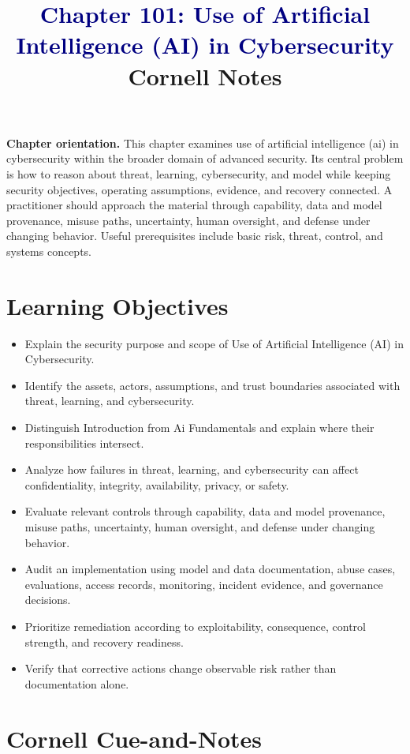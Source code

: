 \documentclass[11pt]{article}
\title{\textcolor{Navy}{Chapter 101: Use of Artificial Intelligence (AI) in Cybersecurity}\\[2mm]\large Cornell Notes}
\author{}
\date{}
\begin{document}
\maketitle
\thispagestyle{fancy}
\vspace{-1.5em}
\begin{orientationbox}
\textbf{Chapter orientation.} This chapter examines use of artificial intelligence (ai) in cybersecurity within the broader domain of advanced security. Its central problem is how to reason about threat, learning, cybersecurity, and model while keeping security objectives, operating assumptions, evidence, and recovery connected. A practitioner should approach the material through capability, data and model provenance, misuse paths, uncertainty, human oversight, and defense under changing behavior. Useful prerequisites include basic risk, threat, control, and systems concepts.
\end{orientationbox}
\section*{Learning Objectives}
\begin{itemize}
\item Explain the security purpose and scope of Use of Artificial Intelligence (AI) in Cybersecurity.
\item Identify the assets, actors, assumptions, and trust boundaries associated with threat, learning, and cybersecurity.
\item Distinguish Introduction from Ai Fundamentals and explain where their responsibilities intersect.
\item Analyze how failures in threat, learning, and cybersecurity can affect confidentiality, integrity, availability, privacy, or safety.
\item Evaluate relevant controls through capability, data and model provenance, misuse paths, uncertainty, human oversight, and defense under changing behavior.
\item Audit an implementation using model and data documentation, abuse cases, evaluations, access records, monitoring, incident evidence, and governance decisions.
\item Prioritize remediation according to exploitability, consequence, control strength, and recovery readiness.
\item Verify that corrective actions change observable risk rather than documentation alone.
\end{itemize}
\section*{Cornell Cue-and-Notes}
\end{document}
